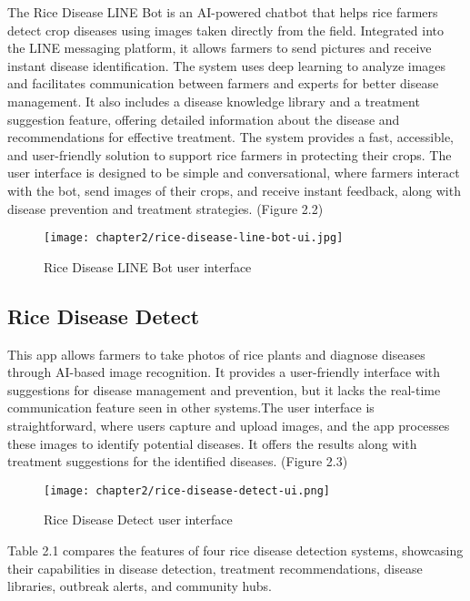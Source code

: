 The Rice Disease LINE Bot is an AI-powered chatbot that helps rice farmers detect crop diseases using images taken directly from the field. Integrated into the LINE messaging platform, it allows farmers to send pictures and receive instant disease identification. The system uses deep learning to analyze images and facilitates communication between farmers and experts for better disease management. It also includes a disease knowledge library and a treatment suggestion feature, offering detailed information about the disease and recommendations for effective treatment. The system provides a fast, accessible, and user-friendly solution to support rice farmers in protecting their crops. The user interface is designed to be simple and conversational, where farmers interact with the bot, send images of their crops, and receive instant feedback, along with disease prevention and treatment strategies. (Figure 2.2)

\begin{figure}[h]
    \centering
    \texttt{[image: chapter2/rice-disease-line-bot-ui.jpg]}
    \caption{Rice Disease LINE Bot user interface}
\end{figure}

\subsection{Rice Disease Detect}
\label{subsection:rice-disease-detect}

This app allows farmers to take photos of rice plants and diagnose diseases through AI-based image recognition. It provides a user-friendly interface with suggestions for disease management and prevention, but it lacks the real-time communication feature seen in other systems.The user interface is straightforward, where users capture and upload images, and the app processes these images to identify potential diseases. It offers the results along with treatment suggestions for the identified diseases. (Figure 2.3)

\begin{figure}[h]
    \centering
    \texttt{[image: chapter2/rice-disease-detect-ui.png]}
    \caption{Rice Disease Detect user interface}
\end{figure}

Table 2.1 compares the features of four rice disease detection systems, showcasing their capabilities in disease detection, treatment recommendations, disease libraries, outbreak alerts, and community hubs.


